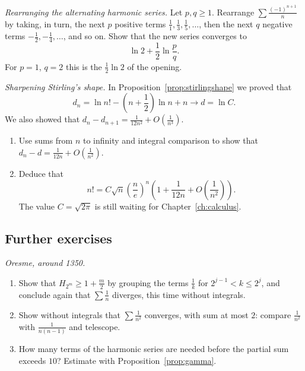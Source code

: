 \begin{exercise}[$\star\star\star$]\label{ex:rearr}
\emph{Rearranging the alternating harmonic series.} Let $p,q\ge1$. Rearrange $\sum\frac{(-1)^{n+1}}n$ by taking, in turn, the next $p$ positive terms
$\frac11,\frac13,\frac15,\dots$, then the next $q$ negative terms $-\frac12,-\frac14,\dots$, and so on. Show that the new series converges to
\[
\ln2+\frac12\ln\frac pq.
\]
For $p=1$, $q=2$ this is the $\frac12\ln2$ of the opening.
\end{exercise}

\begin{exercise}[$\star\star\star$]\label{ex:stirling}
\emph{Sharpening Stirling's shape.} In Proposition~\ref{prop:stirlingshape} we proved that
\[
d_n=\ln n!-\left(n+\frac12\right)\ln n+n\longrightarrow d=\ln C.
\]
We also showed that $d_n-d_{n+1}=\frac1{12n^2}+O(\frac1{n^3})$.
\begin{enumerate}[label=(\alph*)]
\item Use sums from $n$ to infinity and integral comparison to show that
$d_n-d=\frac1{12n}+O(\frac1{n^2})$.
\item Deduce that
\[
n!=C\sqrt n\left(\frac ne\right)^n
\left(1+\frac1{12n}+O\left(\frac1{n^2}\right)\right).
\]
The value $C=\sqrt{2\pi}$ is still waiting for Chapter~\ref{ch:calculus}.
\end{enumerate}
\end{exercise}

\subsection*{Further exercises}

\begin{exercise}[$\star$]\label{ex:oresme}
\emph{Oresme, around 1350.}
\begin{enumerate}[label=(\alph*)]
\item Show that $H_{2^m}\ge1+\frac m2$ by grouping the terms $\frac1k$ for $2^{j-1}<k\le2^j$, and conclude again that $\sum\frac1n$ diverges, this time without integrals.
\item Show without integrals that $\sum\frac1{n^2}$ converges, with sum at most $2$: compare $\frac1{n^2}$ with $\frac1{n(n-1)}$ and telescope.
\item How many terms of the harmonic series are needed before the partial sum exceeds $10$? Estimate with Proposition~\ref{prop:gamma}.
\end{enumerate}
\end{exercise}

